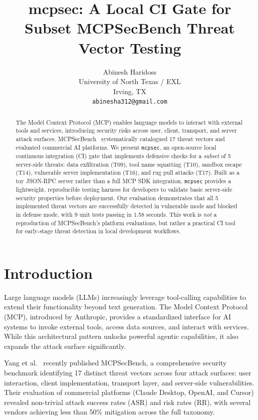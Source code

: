 \documentclass[11pt]{article}
\title{\textbf{mcpsec: A Local CI Gate for Subset MCPSecBench Threat Vector Testing}}
\author{
  Abinesh Haridoss \\
  University of North Texas / EXL \\
  Irving, TX \\
  \texttt{abinesha312@gmail.com}
}
\date{}
\begin{document}
\maketitle

\begin{abstract}
The Model Context Protocol (MCP) enables language models to interact with external tools and services, introducing security risks across user, client, transport, and server attack surfaces. MCPSecBench~\cite{yang2025mcpsecbench} systematically catalogued 17 threat vectors and evaluated commercial AI platforms. We present \texttt{mcpsec}, an open-source local continuous integration (CI) gate that implements defensive checks for a \emph{subset} of 5 server-side threats: data exfiltration (T09), tool name squatting (T10), sandbox escape (T14), vulnerable server implementation (T16), and rug pull attacks (T17). Built as a toy JSON-RPC server rather than a full MCP SDK integration, \texttt{mcpsec} provides a lightweight, reproducible testing harness for developers to validate basic server-side security properties before deployment. Our evaluation demonstrates that all 5 implemented threat vectors are successfully detected in vulnerable mode and blocked in defense mode, with 9 unit tests passing in 1.58 seconds. This work is \emph{not} a reproduction of MCPSecBench's platform evaluations, but rather a practical CI tool for early-stage threat detection in local development workflows.
\end{abstract}

\section{Introduction}

Large language models (LLMs) increasingly leverage tool-calling capabilities to extend their functionality beyond text generation. The Model Context Protocol (MCP), introduced by Anthropic, provides a standardized interface for AI systems to invoke external tools, access data sources, and interact with services. While this architectural pattern unlocks powerful agentic capabilities, it also expands the attack surface significantly.

Yang et al.~\cite{yang2025mcpsecbench} recently published MCPSecBench, a comprehensive security benchmark identifying 17 distinct threat vectors across four attack surfaces: user interaction, client implementation, transport layer, and server-side vulnerabilities. Their evaluation of commercial platforms (Claude Desktop, OpenAI, and Cursor) revealed non-trivial attack success rates (ASR) and risk rates (RR), with several vendors achieving less than 50\% mitigation across the full taxonomy.
\end{document}
